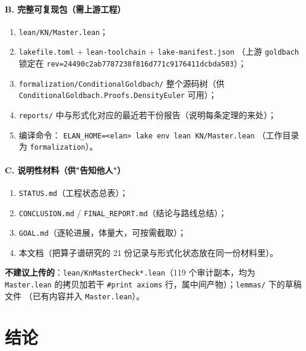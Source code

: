 \documentclass[11pt,a4paper]{ctexart}
\begin{document}
\paragraph{B. 完整可复现包（需上游工程）}
\begin{enumerate}[leftmargin=2.2em]
\item \texttt{lean/KN/Master.lean}；
\item \texttt{lakefile.toml} + \texttt{lean-toolchain} + \texttt{lake-manifest.json}
（上游 \texttt{goldbach} 锁定在 \texttt{rev=24490c2ab7787238f816d771c9176411dcbda503}）；
\item \texttt{formalization/ConditionalGoldbach/} 整个源码树（供 \texttt{ConditionalGoldbach.Proofs.DensityEuler} 可用）；
\item \texttt{reports/} 中与形式化对应的最近若干份报告（说明每条定理的来处）；
\item 编译命令：
\texttt{ELAN\_HOME=<elan> lake env lean KN/Master.lean}
（工作目录为 \texttt{formalization}）。
\end{enumerate}

\paragraph{C. 说明性材料（供"告知他人"）}
\begin{enumerate}[leftmargin=2.2em]
\item \texttt{STATUS.md}（工程状态总表）；
\item \texttt{CONCLUSION.md} / \texttt{FINAL\_REPORT.md}（结论与路线总结）；
\item \texttt{GOAL.md}（逐轮进展，体量大，可按需截取）；
\item 本文档（把算子谱研究的 21 份记录与形式化状态放在同一份材料里）。
\end{enumerate}

\noindent
\textbf{不建议上传的}：\texttt{lean/KnMasterCheck*.lean}（119 个审计副本，均为 \texttt{Master.lean} 的拷贝加若干
\texttt{\#print axioms} 行，属中间产物）；\texttt{lemmas/} 下的草稿文件
（已有内容并入 \texttt{Master.lean}）。

\section{结论}
\end{document}
